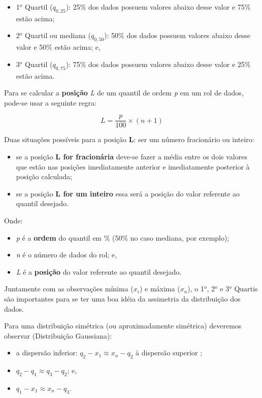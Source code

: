 \documentclass[
]{book}
\providecommand{\tightlist}{%
  \setlength{\itemsep}{0pt}\setlength{\parskip}{0pt}}
\begin{document}
\begin{itemize}
\tightlist
\item
  1\(^{o}\) Quartil (\(q_{0,25}\)): 25\% dos dados possuem valores abaixo desse valor e 75\% estão acima;
\item
  2\(^{o}\) Quartil ou mediana (\(q_{0,50}\)): 50\% dos dados possuem valores abaixo desse valor e 50\% estão acima; e,
\item
  3\(^{o}\) Quartil (\(q_{0,75}\)): 75\% dos dados possuem valores abaixo desse valor e 25\% estão acima.
\end{itemize}

Para se calcular a \textbf{posição} \emph{L} de um quantil de ordem \emph{p} em um rol de dados, pode-se usar a seguinte regra:

\[
L=\frac{p}{100} \times (n+1)
\]

Duas situações possíveis para a posição \textbf{L}: ser um número fracionário ou inteiro:

\begin{itemize}
\tightlist
\item
  se a posição \textbf{L for fracionária} deve-se fazer a média entre os dois valores que estão nas posições imediatamente anterior e imediatamente posterior à posição calculada;
\item
  se a posição \textbf{L for um inteiro} essa será a posição do valor referente ao quantil desejado.
\end{itemize}

Onde:

\begin{itemize}
\tightlist
\item
  \emph{p} é a \textbf{ordem} do quantil em \% (50\% no caso mediana, por exemplo);
\item
  \emph{n} é o número de dados do rol; e,
\item
  \emph{L} é a \textbf{posição} do valor referente ao quantil desejado.
\end{itemize}

Juntamente com as observações mínima (\(x_{i}\)) e máxima (\(x_{n}\)), o 1\(^{o}\), 2\(^{o}\) e 3\(^{o}\) Quartis são importantes para se ter uma boa idéia da assimetria da distribuição dos dados.

Para uma distribuição simétrica (ou aproximadamente simétrica) deveremos observar (Distribuição Gaussiana):

\begin{itemize}
\tightlist
\item
  a dispersão inferior: \(q_{2} - x_{1} \approx x_{n} - q_{2}\) à dispersão superior ;
\item
  \(q_{2} - q_{1} \approx q_{3} - q_{2}\); e,
\item
  \(q_{1} - x_{1} \approx x_{n} - q_{3}\).
\end{itemize}
\end{document}
